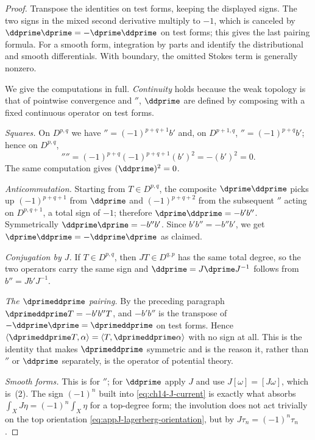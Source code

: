 \begin{proof}
Transpose the identities on test forms, keeping the displayed signs.  The
two signs in the mixed second derivative multiply to $-1$, which is canceled
by $\ddprime\dprime=-\dprime\ddprime$ on test forms; this gives the last
pairing formula.  For a smooth form, integration by parts and
 identify the distributional and
smooth differentials.  With boundary, the omitted Stokes term is generally
nonzero.

We give the computations in full.  \emph{Continuity} holds because the weak
topology is that of pointwise convergence and $\dprime$, $\ddprime$ are
defined by composing with a fixed continuous operator on test forms.

\emph{Squares.}  On $D^{p,q}$ we have $\dprime=(-1)^{p+q+1}b'$ and, on
$D^{p+1,q}$, $\dprime=(-1)^{p+q}b'$; hence on $D^{p,q}$,
\[
 \dprime\dprime=(-1)^{p+q}(-1)^{p+q+1}(b')^2=-(b')^2=0 .
\]
The same computation gives $(\ddprime)^2=0$.

\emph{Anticommutation.}  Starting from $T\in D^{p,q}$, the composite
$\dprime\ddprime$ picks up $(-1)^{p+q+1}$ from $\ddprime$ and
$(-1)^{p+q+2}$ from the subsequent $\dprime$ acting on $D^{p,q+1}$, a total
sign of $-1$; therefore $\dprime\ddprime=-b'b''$.  Symmetrically
$\ddprime\dprime=-b''b'$.  Since $b'b''=-b''b'$, we get
$\dprime\ddprime=-\ddprime\dprime$ as claimed.

\emph{Conjugation by $J$.}  If $T\in D^{p,q}$, then $JT\in D^{q,p}$ has the
same total degree, so the two operators carry the same sign and
$\ddprime=J\dprime J^{-1}$ follows from $b''=Jb'J^{-1}$.

\emph{The $\dprimeddprime$ pairing.}  By the preceding paragraph
$\dprimeddprime T=-b'b''T$, and $-b'b''$ is the transpose of
$-\ddprime\dprime=\dprimeddprime$ on test forms.  Hence
$\langle\dprimeddprime T,\alpha\rangle=\langle T,\dprimeddprime\alpha\rangle$
with no sign at all.  This is the identity that makes
$\dprimeddprime$ symmetric and is the reason it, rather than $\dprime$ or
$\ddprime$ separately, is the operator of potential theory.

\emph{Smooth forms.}  This is  for $\dprime$; for
$\ddprime$ apply $J$ and use $J[\omega]=[J\omega]$, which is
\,(2).  The sign $(-1)^n$ built into
\eqref{eq:ch14-J-current} is exactly what absorbs
$\int_XJ\eta=(-1)^n\int_X\eta$ for a top-degree form; the involution does not
act trivially on the top orientation \eqref{eq:appJ-lagerberg-orientation},
but by $J\tau_n=(-1)^n\tau_n$.
\end{proof}

